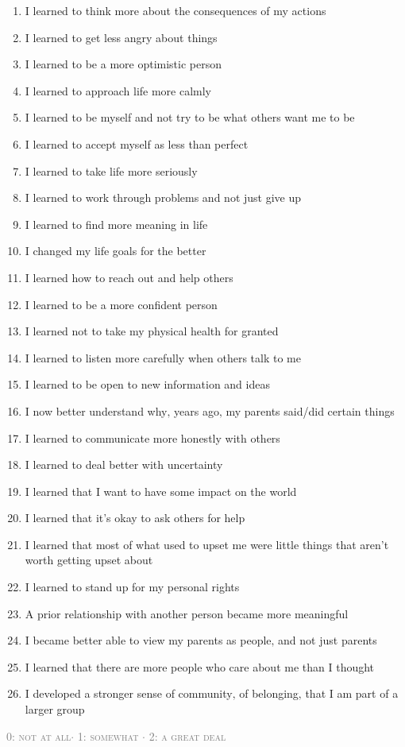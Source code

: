\documentclass[14pt, a1paper]{memoir}
\begin{document}
\begin{enumerate}
    \item I learned to think more about the consequences of my actions
    \item I learned to get less angry about things
    \item I learned to be a more optimistic person
    \item I learned to approach life more calmly
    \item I learned to be myself and not try to be what others want me to be
    \item I learned to accept myself as less than perfect
    \item I learned to take life more seriously
    \item I learned to work through problems and not just give up
    \item I learned to find more meaning in life
    \item I changed my life goals for the better
    \item I learned how to reach out and help others
    \item I learned to be a more confident person
    \item I learned not to take my physical health for granted
    \item I learned to listen more carefully when others talk to me
    \item I learned to be open to new information and ideas
    \item I now better understand why‚ years ago‚ my parents said/did certain things
    \item I learned to communicate more honestly with others
    \item I learned to deal better with uncertainty
    \item I learned that I want to have some impact on the world
    \item I learned that it’s okay to ask others for help
    \item I learned that most of what used to upset me were little things that aren’t worth getting upset about
    \item I learned to stand up for my personal rights
    \item A prior relationship with another person became more meaningful
    \item I became better able to view my parents as people‚ and not just parents
    \item I learned that there are more people who care about me than I thought
    \item I developed a stronger sense of community‚ of belonging‚ that I am part of a larger group
\end{enumerate}

\vspace{48pt}
\large{
\textcolor{gray}{0: \textsc{not at all}\hspace{4pt}$\cdot$\hspace{4pt} 1: \textsc{somewhat} \hspace{4pt}$\cdot$\hspace{4pt} 2: \textsc{a great deal}}}
\end{document}
